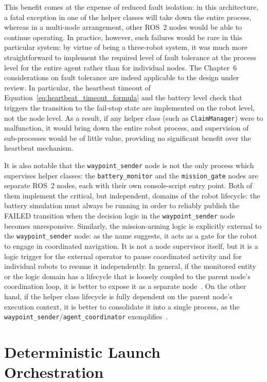 This benefit comes at the expense of reduced fault isolation: in this architecture, a fatal exception in one of the helper classes will take down the entire process, whereas in a multi-node arrangement, other ROS~2 nodes would be able to continue operating. In practice, however, such failures would be rare in this particular system: by virtue of being a three-robot system, it was much more straightforward to implement the required level of fault tolerance at the process level for the entire agent rather than for individual nodes. The Chapter~6 considerations on fault tolerance are indeed applicable to the design under review. In particular, the heartbeat timeout of Equation~\ref{eq:heartbeat_timeout_formula} and the battery level check that triggers the transition to the fail-stop state are implemented on the robot level, not the node level. As a result, if any helper class (such as \texttt{ClaimManager}) were to malfunction, it would bring down the entire robot process, and supervision of sub-processes would be of little value, providing no significant benefit over the heartbeat mechanism.

It is also notable that the \texttt{waypoint\_sender} node is not the only process which supervises helper classes: the \texttt{battery\_monitor} and the \texttt{mission\_gate} nodes are separate ROS~2 nodes, each with their own console-script entry point. Both of them implement the critical, but independent, domains of the robot lifecycle: the battery simulation must always be running in order to reliably publish the FAILED transition when the decision logic in the \texttt{waypoint\_sender} node becomes unresponsive. Similarly, the mission-arming logic is explicitly external to the \texttt{waypoint\_sender} node: as the name suggests, it acts as a gate for the robot to engage in coordinated navigation. It is not a node supervisor itself, but it is a logic trigger for the external operator to pause coordinated activity and for individual robots to resume it independently. In general, if the monitored entity or the logic domain has a lifecycle that is loosely coupled to the parent node's coordination loop, it is better to expose it as a separate node~\cite{teper2024timing}. On the other hand, if the helper class lifecycle is fully dependent on the parent node's execution context, it is better to consolidate it into a single process, as the \texttt{waypoint\_sender}/\texttt{agent\_coordinator} exemplifies~\cite{macenski2023impact}.

\section{Deterministic Launch Orchestration}

